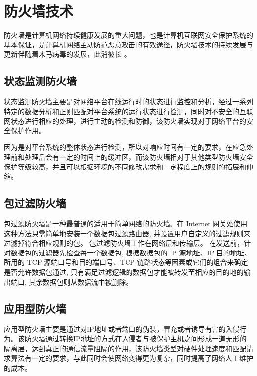\chapter{防火墙技术}
防火墙是计算机网络持续健康发展的重大问题，也是计算机互联网安全保护系统的基本保证，是计算机网络主动防范恶意攻击的有效途径，防火墙技术的持续发展与更新伴随着木马病毒的发展，此消彼长\cite{4} 。


\section{状态监测防火墙}
状态监测防火墙主要是对网络平台在线运行时的状态进行监控和分析，经过一系列特定的数据分析和正则匹配对平台系统的运行状态进行检测，同时对不安全的互联网状态进行相应的处理，进行主动的检测和防御，该防火墙实现对于网络平台的安全保护作用。

因为是对平台系统的整体状态进行检测，所以对响应时间有一定的要求，在应急处理前和处理后会有一定的时间上的缓冲区，而该防火墙相对于其他类型防火墙安全保护等级较高，并且可以根据环境的不同修改需求和一定程度上的规则的拓展和伸缩。

\section{包过滤防火墙}

包过滤防火墙是一种最普通的适用于简单网络的防火墙。在 Internet 网关处使用这种方法只需简单地安装一个数据包过滤路由器, 并设置用户自定义的过滤规则来过滤掉符合相应规则的包。 包过滤防火墙工作在网络层和传输层。 在发送前，针对数据包的过滤器先检查每一个数据包, 根据数据包的 IP 源地址、IP 目的地址、所用的 TCP 源端口号和目的端口号、TCP 链路状态等因素或它们的组合来确定是否允许数据包通过, 只有满足过滤逻辑的数据包才能被转发至相应的目的地的输出端口, 其余数据包则从数据流中被删除。

\section{应用型防火墙}

应用型防火墙主要是通过对IP地址或者端口的伪装，冒充或者诱导有害的入侵行为。该防火墙通过转换IP地址的方式在入侵者与被保护主机之间形成一道无形的隔离层，达到真正的通信流量阻隔的作用，该防火墙类型对硬件处理速度和匹配请求算法有一定的要求，与此同时会使网络变得更为复杂，同时提高了网络人工维护的成本。









